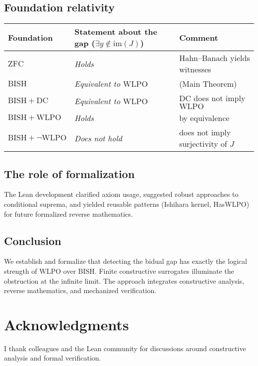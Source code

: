 \documentclass[11pt]{article}  %
\newcommand{\WLPO}{\mathrm{WLPO}}
\newcommand{\BISH}{\mathrm{BISH}}
\newcommand{\DC}{\mathrm{DC}}
\newcommand{\ZFC}{\mathrm{ZFC}}
\begin{document}
\subsection{Foundation relativity}

\begin{center}
\small %
\begin{tabular}{lll}
\toprule
Foundation & Statement about the gap ($\exists y\notin \mathrm{im}(J)$) & Comment \\
\midrule
$\ZFC$ & \emph{Holds} & Hahn--Banach yields witnesses \\
$\BISH$ & \emph{Equivalent to $\WLPO$} & (Main Theorem) \\
$\BISH+\DC$ & \emph{Equivalent to $\WLPO$} & $\DC$ does not imply $\WLPO$ \\
$\BISH+\WLPO$ & \emph{Holds} & by equivalence \\
$\BISH+\neg\WLPO$ & \emph{Does not hold} & does not imply surjectivity of $J$ \\
\bottomrule
\end{tabular}
\end{center}

\subsection{The role of formalization}

The Lean development clarified axiom usage, suggested robust approaches to conditional suprema, and yielded reusable patterns (Ishihara kernel, HasWLPO) for future formalized reverse mathematics.

\subsection{Conclusion}

We establish and formalize that detecting the bidual gap has exactly the logical strength of $\WLPO$ over $\BISH$. Finite constructive surrogates illuminate the obstruction at the infinite limit. The approach integrates constructive analysis, reverse mathematics, and mechanized verification.

\section*{Acknowledgments}

I thank colleagues and the Lean community for discussions around constructive analysis and formal verification.
\end{document}
